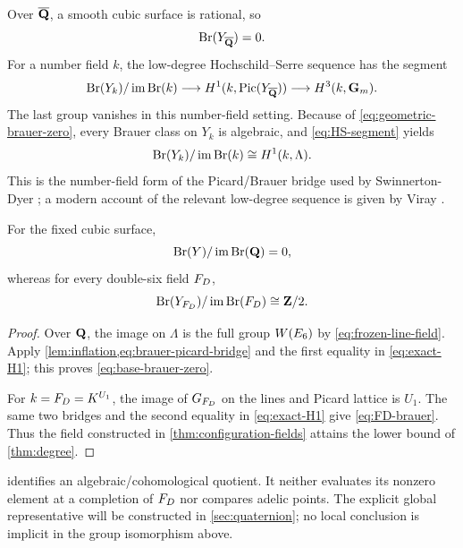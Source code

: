 Over \(\overline{\mathbf Q}\), a smooth cubic surface is rational, so
\begin{equation}
 \operatorname{Br}(Y_{\overline{\mathbf Q}})=0.
\label{eq:geometric-brauer-zero}
\end{equation}
For a number field \(k\), the low-degree Hochschild--Serre sequence has the
segment
\begin{equation}
 \operatorname{Br}(Y_k)/\operatorname{im}\operatorname{Br}(k)
 \longrightarrow H^1(k,\operatorname{Pic}(Y_{\overline{\mathbf Q}}))
 \longrightarrow H^3(k,\mathbf G_m).
\label{eq:HS-segment}
\end{equation}
The last group vanishes in this number-field setting.  Because of
\cref{eq:geometric-brauer-zero}, every Brauer class on \(Y_k\) is algebraic,
and \cref{eq:HS-segment} yields
\begin{equation}
 \operatorname{Br}(Y_k)/\operatorname{im}\operatorname{Br}(k)
 \cong H^1(k,\Lambda).
\label{eq:brauer-picard-bridge}
\end{equation}
This is the number-field form of the Picard/Brauer bridge used by
Swinnerton-Dyer \cite{SwinnertonDyer1993}; a modern account of the relevant
low-degree sequence is given by Viray \cite{Viray2023}.

\begin{theorem}
\label{thm:brauer-jump}
For the fixed cubic surface,
\begin{equation}
 \operatorname{Br}(Y)/\operatorname{im}\operatorname{Br}(\mathbf Q)=0,
\label{eq:base-brauer-zero}
\end{equation}
whereas for every double-six field \(F_D\),
\begin{equation}
 \operatorname{Br}(Y_{F_D})/\operatorname{im}\operatorname{Br}(F_D)\cong\mathbf Z/2.
\label{eq:FD-brauer}
\end{equation}
\end{theorem}

\begin{proof}
Over \(\mathbf Q\), the image on \(\Lambda\) is the full group \(W(E_6)\) by
\cref{eq:frozen-line-field}.  Apply
\cref{lem:inflation,eq:brauer-picard-bridge} and the first equality in
\cref{eq:exact-H1}; this proves \cref{eq:base-brauer-zero}.

For \(k=F_D=K^{U_1}\), the image of \(G_{F_D}\) on the lines and Picard
lattice is \(U_1\).  The same two bridges and the second equality in
\cref{eq:exact-H1} give \cref{eq:FD-brauer}.  Thus the field constructed in
\cref{thm:configuration-fields} attains the lower bound of
\cref{thm:degree}.
\end{proof}

\begin{remark}
 identifies an algebraic/cohomological quotient.
It neither evaluates its nonzero element at a completion of \(F_D\) nor
compares adelic points.  The explicit global representative will be
constructed in \cref{sec:quaternion}; no local conclusion is implicit in the
group isomorphism above.
\end{remark}
